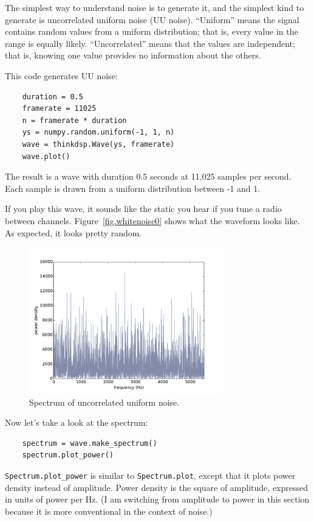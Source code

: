 \documentclass[12pt]{book}
\begin{document}
The simplest way to understand noise is to generate it, and the
simplest kind to generate is uncorrelated uniform noise (UU noise).
``Uniform'' means the signal contains random values from a uniform
distribution; that is, every value in the range is equally likely.
``Uncorrelated'' means that the values are independent; that is,
knowing one value provides no information about the others.

This code generates UU noise:

\begin{verbatim}
    duration = 0.5
    framerate = 11025
    n = framerate * duration
    ys = numpy.random.uniform(-1, 1, n)
    wave = thinkdsp.Wave(ys, framerate)
    wave.plot()
\end{verbatim}

The result is a wave with duration 0.5 seconds at 11,025
samples per second.  Each sample is drawn from a uniform distribution
between -1 and 1.

If you play this wave, it sounds like the static you hear if you tune
a radio between channels.  Figure~\ref{fig.whitenoise0} shows what the
waveform looks like.  As expected, it looks pretty random.

\begin{figure}
\centerline{\includegraphics[height=2.5in]{figs/whitenoise1.pdf}}
\caption{Spectrum of uncorrelated uniform noise.}
\label{fig.whitenoise1}
\end{figure}

Now let's take a look at the spectrum:

\begin{verbatim}
    spectrum = wave.make_spectrum()
    spectrum.plot_power()
\end{verbatim}

\verb"Spectrum.plot_power" is similar to \verb"Spectrum.plot",
except that it plots power density instead of amplitude.  Power 
density is the square of amplitude, expressed in units of power per Hz.
(I am switching from amplitude to power in this section because
it is more conventional in the context of noise.)
\end{document}
